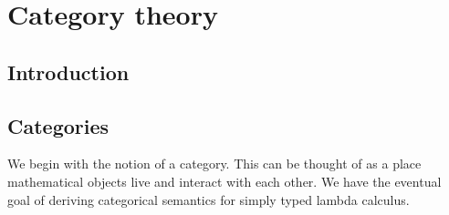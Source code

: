 \newcommand{\Ob}[1]{\text{Ob}(#1)}
\newcommand{\mc}[1]{\mathcal{#1}}

\section{Category theory}

\subsection{Introduction}




\subsection{Categories}

We begin with the notion of a category. This can be thought of as a place mathematical objects live and interact with each other. We have the eventual goal of deriving categorical semantics for simply typed lambda calculus.

